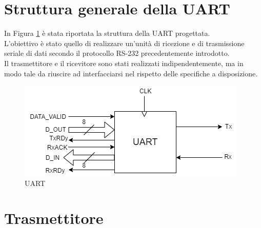 \documentclass[a4paper, titlepage]{article}
\begin{document}
\section{Struttura generale della UART}
In Figura \ref{fig:UART} è stata riportata la struttura della UART progettata.\\L'obiettivo è stato quello di realizzare un'unità di ricezione e di trasmissione seriale di dati secondo il protocollo RS-232 precedentemente introdotto.\\Il trasmettitore e il ricevitore sono stati realizzati indipendentemente, ma in modo tale da riuscire ad interfacciarsi nel rispetto delle specifiche a disposizione.
\begin{figure}[h]
    \centering
    \includegraphics[scale=0.8]{UART.png} 
    \caption{UART}
    \label{fig:UART}
\end{figure}
\section{Trasmettitore}
\end{document}
